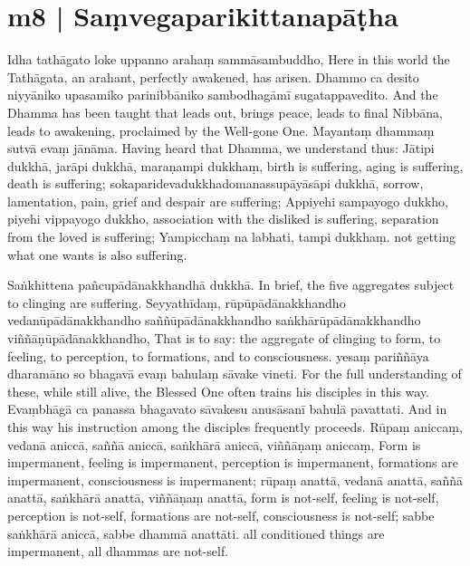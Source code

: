 \section*{m8 | Saṃvegaparikittanapāṭha}

\begin{chantsubsection}
  \chantlineinline
    {Idha tathāgato loke uppanno arahaṃ sammāsambuddho,}
    {Here in this world the Tathāgata, an arahant, perfectly awakened, has arisen.}
  \chantlineinline
    {Dhammo ca desito niyyāniko upasamiko parinibbāniko
     sambodhagāmī sugatappavedito.}
    {And the Dhamma has been taught that leads out, brings peace, leads to final Nibbāna,
     leads to awakening, proclaimed by the Well-gone One.}
  \chantlineinline
    {Mayantaṃ dhammaṃ sutvā evaṃ jānāma.}
    {Having heard that Dhamma, we understand thus:}
  \chantlineinline
    {Jātipi dukkhā, jarāpi dukkhā, maraṇampi dukkhaṃ,}
    {birth is suffering, aging is suffering, death is suffering;}
  \chantlineinline
    {sokaparidevadukkhadomanassupāyāsāpi dukkhā,}
    {sorrow, lamentation, pain, grief and despair are suffering;}
  \chantlineinline
    {Appiyehi sampayogo dukkho, piyehi vippayogo dukkho,}
    {association with the disliked is suffering, separation from the loved is suffering;}
  \chantlineinline
    {Yampicchaṃ na labhati, tampi dukkhaṃ.}
    {not getting what one wants is also suffering.}
\end{chantsubsection}
\chantgap
\begin{chantsubsection}
  \chantlineinline
    {Saṅkhittena pañcupādānakkhandhā dukkhā.}
    {In brief, the five aggregates subject to clinging are suffering.}
  \chantlineinline
    {Seyyathīdaṃ, rūpūpādānakkhandho vedanūpādānakkhandho
     saññūpādānakkhandho saṅkhārūpādānakkhandho
     viññāṇūpādānakkhandho,}
    {That is to say: the aggregate of clinging to form, to feeling, to perception,
     to formations, and to consciousness.}
  \chantlineinline
    {yesaṃ pariññāya dharamāno so bhagavā evaṃ bahulaṃ sāvake vineti.}
    {For the full understanding of these, while still alive, the Blessed One often
     trains his disciples in this way.}
  \chantlineinline
    {Evaṃbhāgā ca panassa bhagavato sāvakesu anusāsanī bahulā pavattati.}
    {And in this way his instruction among the disciples frequently proceeds.}
  \chantlineinline
    {Rūpaṃ aniccaṃ, vedanā aniccā, saññā aniccā, saṅkhārā aniccā,
     viññāṇaṃ aniccaṃ,}
    {Form is impermanent, feeling is impermanent, perception is impermanent,
     formations are impermanent, consciousness is impermanent;}
  \chantlineinline
    {rūpaṃ anattā, vedanā anattā, saññā anattā, saṅkhārā anattā,
     viññāṇaṃ anattā,}
    {form is not-self, feeling is not-self, perception is not-self,
     formations are not-self, consciousness is not-self;}
  \chantlineinline
    {sabbe saṅkhārā aniccā, sabbe dhammā anattāti.}
    {all conditioned things are impermanent, all dhammas are not-self.}
\end{chantsubsection}
